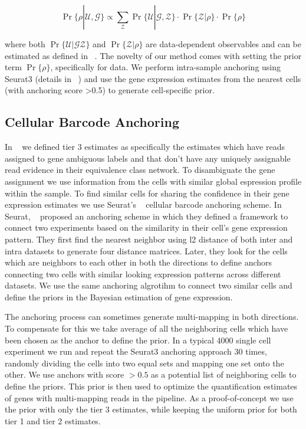\begin{equation}
    \Pr \{ \rho | \mathcal{U}, \mathcal{G} \} 
    \propto \sum_{\mathcal{Z}} \Pr\{ \mathcal{U} | \mathcal{G}, \mathcal{Z} \}
    \cdot \Pr\{ \mathcal{Z} | \rho \} \cdot \Pr\{ \rho \}
\end{equation}

where both $\Pr\{ \mathcal{U} | \mathcal{G} \mathcal{Z} \}$ and $\Pr\{ \mathcal{Z} | \rho \}$ are 
data-dependent observables and can be estimated as defined in ~\citet{salmon}. The novelty of our method
comes with setting the prior term $\Pr\{ \rho \}$, specifically for \dscrnaseq data. We perform
intra-sample anchoring using Seurat3 (details in ~) and use the gene expression
estimates from the nearest cells (with anchoring score >0.5) to generate cell-specific prior.

\subsection{Cellular Barcode Anchoring}
\label{subsec:anchor}
In ~ we defined tier 3 estimates as specifically the estimates which have reads assigned 
to gene ambiguous labels and that don't have any uniquely assignable read evidence in their equivalence 
class network. To disambiguate the gene assignment we use 
information from the cells with similar global espression profile within the sample. To find similar cells for sharing 
the confidence in their gene expression estimates we use Seurat's ~\citep{seurat3} cellular
barcode anchoring scheme. In Seurat, ~\citet{seurat3} proposed an anchoring scheme in which they 
defined a framework to connect two experiments based on the similarity in their cell's gene expression 
pattern. They first find the nearest neighbor using l2 distance of both inter and intra datasets to generate 
four distance matrices. Later, they look for the cells which are neighbors to each other in both 
the directions to define anchors connecting two cells with similar looking expression patterns 
across different \singlecell datasets. We use the same anchoring algrotihm to connect two similar 
cells and define the priors in the Bayesian estimation of gene expression.

The anchoring process can sometimes generate multi-mapping in both directions. To compensate for this we take 
average of all the neighboring cells which have been chosen as the anchor to define the prior. In a typical 4000 single 
cell experiment we run \alevin and repeat the Seurat3 anchoring approach $30$ times, randomly dividing 
the cells into two equal sets and mapping one set onto the other. We use anchors with score $>0.5$ as a potential list 
of neighboring cells to define the priors. This prior is then used to optimize the quantification estimates of genes with multi-mapping reads in the \alevin pipeline. As a proof-of-concept we use the prior with only the tier 3 
estimates, while keeping the uniform prior for both tier 1 and tier 2 estimates.

